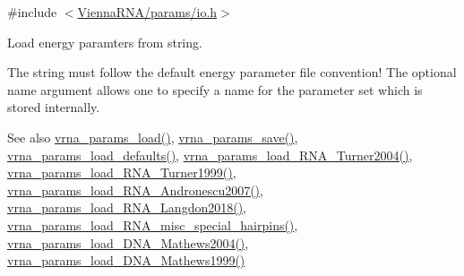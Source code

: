 {\ttfamily \#include $<$\mbox{\hyperlink{io_8h}{Vienna\+R\+N\+A/params/io.\+h}}$>$}



Load energy paramters from string. 

The string must follow the default energy parameter file convention! The optional {\ttfamily name} argument allows one to specify a name for the parameter set which is stored internally.

\begin{DoxySeeAlso}{See also}
\mbox{\hyperlink{group__energy__parameters__rw_gabb0583595c67094986ef90cb4f1c7555}{vrna\+\_\+params\+\_\+load()}}, \mbox{\hyperlink{group__energy__parameters__rw_ga0de3731b3e4017c52bd678549f6c4ae5}{vrna\+\_\+params\+\_\+save()}}, \mbox{\hyperlink{group__energy__parameters__rw_ga413bc688695c9a707dbcc678412d6792}{vrna\+\_\+params\+\_\+load\+\_\+defaults()}}, \mbox{\hyperlink{group__energy__parameters__rw_ga7327fe66ef60c33ba80a87c04db0ee83}{vrna\+\_\+params\+\_\+load\+\_\+\+R\+N\+A\+\_\+\+Turner2004()}}, \mbox{\hyperlink{group__energy__parameters__rw_ga804393b6dfe06a2c6cae89219dffabb1}{vrna\+\_\+params\+\_\+load\+\_\+\+R\+N\+A\+\_\+\+Turner1999()}}, \mbox{\hyperlink{group__energy__parameters__rw_ga511a1c17c0fd10a1fbb0936674712ff8}{vrna\+\_\+params\+\_\+load\+\_\+\+R\+N\+A\+\_\+\+Andronescu2007()}}, \mbox{\hyperlink{group__energy__parameters__rw_ga3a87fe5e73eb906c0fa26f2c42c787fd}{vrna\+\_\+params\+\_\+load\+\_\+\+R\+N\+A\+\_\+\+Langdon2018()}}, \mbox{\hyperlink{group__energy__parameters__rw_ga00e07504d66dc24aca7befb4bdaa0db1}{vrna\+\_\+params\+\_\+load\+\_\+\+R\+N\+A\+\_\+misc\+\_\+special\+\_\+hairpins()}}, \mbox{\hyperlink{group__energy__parameters__rw_gafa45b5734355baa634ca0a2e2857563e}{vrna\+\_\+params\+\_\+load\+\_\+\+D\+N\+A\+\_\+\+Mathews2004()}}, \mbox{\hyperlink{group__energy__parameters__rw_ga4d897130a700f86b7d4035a95f25615a}{vrna\+\_\+params\+\_\+load\+\_\+\+D\+N\+A\+\_\+\+Mathews1999()}}
\end{DoxySeeAlso}


